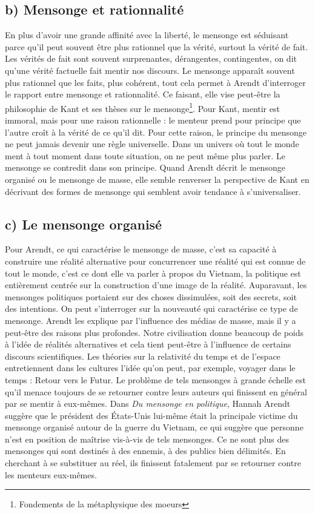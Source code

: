 \documentclass[12pt]{article}
\begin{document}
\subsection*{b) Mensonge et rationnalité}
En plus d'avoir une grande affinité avec la liberté, le mensonge est séduisant parce qu'il peut souvent être plus rationnel que la vérité, surtout la vérité de fait.
Les vérités de fait sont souvent surprenantes, dérangentes, contingentes, on dit qu'une vérité factuelle fait mentir nos discours.
Le mensonge apparaît souvent plus rationnel que les faits, plus cohérent, tout cela permet à Arendt d'interroger le rapport entre mensonge et rationnalité.
Ce faisant, elle vise peut-être la philosophie de Kant et ses thèses sur le mensonge\footnote{Fondements de la métaphysique des moeurs}. 
Pour Kant, mentir est immoral, mais pour une raison rationnelle : le menteur prend pour principe que l'autre croît à la vérité de ce qu'il dit.
Pour cette raison, le principe du mensonge ne peut jamais devenir une règle universelle.
Dans un univers où tout le monde ment à tout moment dans toute situation, on ne peut même plus parler.
Le mensonge se contredit dans son principe.
Quand Arendt décrit le mensonge organisé ou le mensonge de masse, elle semble renverser la perspective de Kant en décrivant des formes de mensonge qui semblent avoir tendance à s'universaliser.
\subsection*{c) Le mensonge organisé}
Pour Arendt, ce qui caractérise le mensonge de masse, c'est sa capacité à construire une réalité alternative pour concurrencer une réalité qui est connue de tout le monde, c'est ce dont elle va parler à propos du Vietnam, la politique est entièrement centrée sur la construction d'une image de la réalité.
Auparavant, les mensonges politiques portaient sur des choses dissimulées, soit des secrets, soit des intentions.
On peut s'interroger sur la nouveauté qui caractérise ce type de mensonge.
Arendt les explique par l'influence des médias de masse, mais il y a peut-être des raisons plus profondes.
Notre civilisation donne beaucoup de poids à l'idée de réalités alternatives et cela tient peut-être à l'influence de certains discours scientifiques.
Les théories sur la relativité du temps et de l'espace entretiennent dans les cultures l'idée qu'on peut, par exemple, voyager dans le temps : Retour vers le Futur.
Le problème de tels mensonges à grande échelle est qu'il menace toujours de se retourner contre leurs auteurs qui finissent en général par se mentir à eux-mêmes.
Dans \emph{Du mensonge en politique}, Hannah Arendt suggère que le président des États-Unis lui-même était la principale victime du mensonge organisé autour de la guerre du Vietnam, ce qui suggère que personne n'est en position de maîtrise vis-à-vis de tels mensonges.
Ce ne sont plus des mensonges qui sont destinés à des ennemis, à des publics bien délimités.
En cherchant à se substituer au réel, ils finissent fatalement par se retourner contre les menteurs eux-mêmes. 
\end{document}
